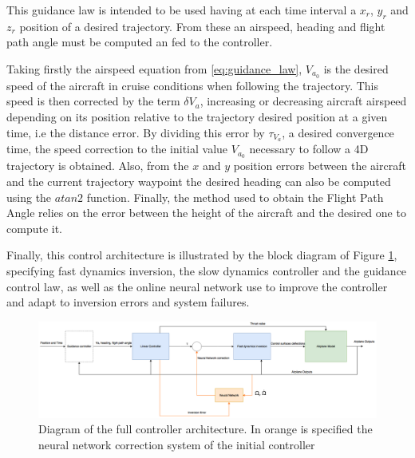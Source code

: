 This guidance law is intended to be used having at each time interval a $x_r$, $y_r$ and $z_r$ position of a desired trajectory. From these an airspeed, heading and flight path angle must be computed an fed to the controller.

Taking firstly the airspeed equation from \ref{eq:guidance_law}, $V_{a_0}$ is the desired speed of the aircraft in cruise conditions when following the trajectory. This speed is then corrected by the term $\delta V_a$, increasing or decreasing aircraft airspeed depending on its position relative to the trajectory desired position at a given time, i.e the distance error. By dividing this error by $\tau_{V_a}$, a desired convergence time, the speed correction to the initial value $V_{a_0}$ necessary to follow a 4D trajectory is obtained. Also, from the $x$ and $y$ position errors between the aircraft and the current trajectory waypoint the desired heading can also be computed using the $atan2$ function. Finally, the method used to obtain the Flight Path Angle relies on the error between the height of the aircraft and the desired one to compute it. 

Finally, this control architecture is illustrated by the block diagram of Figure \ref{fig:full_controller}, specifying fast dynamics inversion, the slow dynamics controller and the guidance control law, as well as the online neural network use to improve the controller and adapt to inversion errors and system failures.
\begin{figure}[h]  
  \includegraphics[width=1\textwidth]{../Figures/full_controller_special.png}
  \caption[Diagram of the controller architecture]{Diagram of the full controller architecture. In orange is specified the neural network correction system of the initial controller}
  \label{fig:full_controller}
\end{figure}